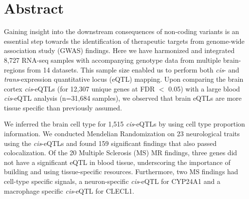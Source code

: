 { \Large {} }

\section*{Abstract}
Gaining insight into the downstream consequences of non-coding variants is an essential step towards the identification of therapeutic targets from genome-wide association study (GWAS) findings.  Here we have harmonized and integrated 8,727 RNA-seq samples with accompanying genotype data from multiple brain-regions from 14 datasets. This sample size enabled us to perform both \textit{cis}- and \textit{trans}-expression quantitative locus (eQTL) mapping. Upon comparing the brain cortex \textit{cis}-eQTLs (for 12,307 unique genes at FDR $<$ 0.05) with a large blood \textit{cis}-eQTL analysis (n=31,684 samples), we observed that brain eQTLs are more tissue specific than previously assumed. 

We inferred the brain cell type for 1,515 \textit{cis}-eQTLs by using cell type proportion information. We conducted Mendelian Randomization on 23 neurological traits using the \textit{cis}-eQTLs and found 159 significant findings that also passed colocalization. Of the 20 Multiple Sclerosis (MS) MR findings, three genes did not have a significant eQTL in blood tissue, underscoring the importance of building and using tissue-specific resources. Furthermore, two MS findings had cell-type specific signals, a neuron-specific \textit{cis}-eQTL for CYP24A1 and a macrophage specific \textit{cis}-eQTL for CLECL1.  

